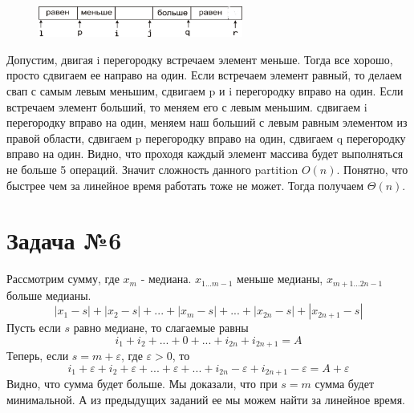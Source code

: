 \documentclass{article}
\begin{document}
\begin{figure}[H]
    \centering
    \includegraphics[width=0.6\textwidth]{1.png}
\end{figure}

Допустим, двигая i перегородку встречаем элемент меньше. Тогда все хорошо, просто сдвигаем ее направо на один. Если встречаем элемент равный, то делаем свап с самым левым меньшим, сдвигаем p и i перегородку вправо на один. Если встречаем элемент больший, то меняем его с левым меньшим. сдвигаем i перегородку вправо на один, меняем наш больший с левым равным элементом из правой области, сдвигаем p перегородку вправо на один, сдвигаем q перегородку вправо на один. 
Видно, что проходя каждый элемент массива будет выполняться не больше 5 операций. Значит сложность данного partition $O(n)$. Понятно, что быстрее чем за линейное время работать тоже не может. Тогда получаем $\Theta(n)$.


\section*{Задача №6}
Рассмотрим сумму, где $x_m$ - медиана. $x_{1...m - 1}$ меньше медианы, $x_{m + 1...2n - 1}$ больше медианы.
\[ |x_1 - s| + |x_2 - s| + ... + |x_m - s| + ... + |x_{2n} - s| + |x_{2n + 1} - s| \]
Пусть если $s$ равно медиане, то слагаемые равны 
\[ i_1 + i_2 + ... + 0 + ... + i_{2n} + i_{2n + 1} = A \] 
Теперь, если $s = m + \varepsilon$, где $\varepsilon > 0$, то
\[ i_1 + \varepsilon + i_2 + \varepsilon + ... + \varepsilon + ... + i_{2n} - \varepsilon + i_{2n + 1} - \varepsilon = A + \varepsilon \] 
Видно, что сумма будет больше. Мы доказали, что при $s = m$ сумма будет минимальной. А из предыдущих заданий ее мы можем найти за линейное время.
\end{document}

